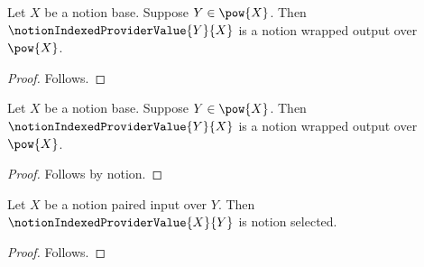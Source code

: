 \begin{classification}\label{notion_indexed_provider_composite_guard_result}
    Let $X$ be a notion base.
    Suppose $Y\in\pow{X}$.
    Then $\notionIndexedProviderValue{Y}{X}$ is a notion wrapped output
        over $\pow{X}$.
\end{classification}
\begin{proof}
    Follows.
\end{proof}

\begin{proposition}\label{notion_indexed_provider_composite_guard}
    Let $X$ be a notion base.
    Suppose $Y\in\pow{X}$.
    Then $\notionIndexedProviderValue{Y}{X}$ is a notion wrapped output
        over $\pow{X}$.
\end{proposition}
\begin{proof}
    Follows by notion.
\end{proof}

\begin{proposition}\label{notion_indexed_provider_parameter_erasure}
    Let $X$ be a notion paired input over $Y$.
    Then $\notionIndexedProviderValue{X}{Y}$ is notion selected.
\end{proposition}
\begin{proof}
    Follows.
\end{proof}
